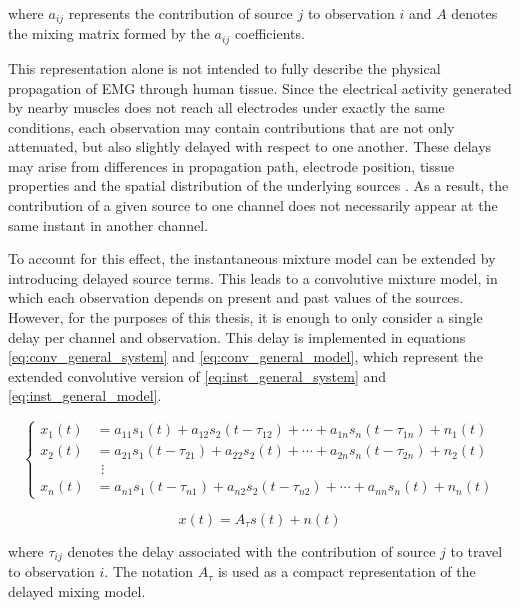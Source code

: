 \noindent where $a_{ij}$ represents the contribution of source $j$ to observation $i$ and $A$ denotes the mixing matrix formed by the $a_{ij}$ coefficients.

This representation alone is not intended to fully describe the physical propagation of EMG through human tissue. Since the electrical activity generated by nearby muscles does not reach all electrodes under exactly the same conditions, each observation may contain contributions that are not only attenuated, but also slightly delayed with respect to one another. These delays may arise from differences in propagation path, electrode position, tissue properties and the spatial distribution of the underlying sources \cite{muceli_tutorial_2024}. As a result, the contribution of a given source to one channel does not necessarily appear at the same instant in another channel.

To account for this effect, the instantaneous mixture model can be extended by introducing delayed source terms. This leads to a convolutive mixture model, in which each observation depends on present and past values of the sources. However, for the purposes of this thesis, it is enough to only consider a single delay per channel and observation. This delay is implemented in equations \ref{eq:conv_general_system} and \ref{eq:conv_general_model}, which represent the extended convolutive version of \ref{eq:inst_general_system} and \ref{eq:inst_general_model}.

\begin{equation}
\left\{
\begin{aligned}
x_1(t) &= a_{11}s_1(t) + a_{12}s_2(t-\tau_{12}) + \cdots + a_{1n}s_n(t-\tau_{1n}) + n_1(t) \\
x_2(t) &= a_{21}s_1(t-\tau_{21}) + a_{22}s_2(t) + \cdots + a_{2n}s_n(t-\tau_{2n}) + n_2(t) \\
&\ \,\vdots \\
x_n(t) &= a_{n1}s_1(t-\tau_{n1}) + a_{n2}s_2(t-\tau_{n2}) + \cdots + a_{nn}s_n(t) + n_n(t)
\end{aligned}
\right.
\label{eq:conv_general_system}
\end{equation}

\begin{equation}
    x(t)=A_{\tau}s(t)+n(t)    
    \label{eq:conv_general_model}
\end{equation}

\noindent where $\tau_{ij}$ denotes the delay associated with  the contribution of source $j$ to travel to observation $i$. The notation  $A_{\tau}$ is used as a compact representation of the delayed mixing model.

